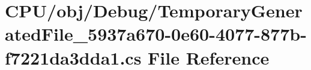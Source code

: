 \hypertarget{obj_2_debug_2_temporary_generated_file__5937a670-0e60-4077-877b-f7221da3dda1_8cs}{}\section{C\+P\+U/obj/\+Debug/\+Temporary\+Generated\+File\+\_\+5937a670-\/0e60-\/4077-\/877b-\/f7221da3dda1.cs File Reference}
\label{obj_2_debug_2_temporary_generated_file__5937a670-0e60-4077-877b-f7221da3dda1_8cs}
